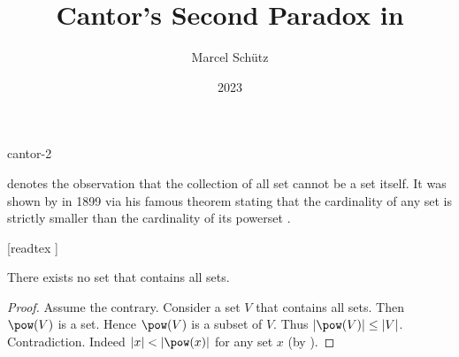 \documentclass{stex}
\begin{document}
\title{Cantor's Second Paradox in \Naproche}
\author{Marcel Schütz}
\date{2023}
\maketitle
\begin{smodule}{cantor-2}
\begin{sparagraph}
  \emph{} denotes the observation that the collection of all set cannot be a set itself.
  It was shown by  in 1899 via his famous theorem stating that the cardinality of any set is strictly smaller than the cardinality of its powerset \cite[chapter 163]{Cantor1991}.
\end{sparagraph}

\begin{forthel}
  [readtex ]

  \begin{theorem*}\label{cantor_paradox_2}
    There exists no set that contains all sets.
  \end{theorem*}
  \begin{proof}
    Assume the contrary.
    Consider a set $V$ that contains all sets.
    Then $\pow(V)$ is a set.
    Hence $\pow(V)$ is a subset of $V$.
    Thus $|\pow(V)| \leq |V|$.
    Contradiction.
    Indeed $|x| < |\pow(x)|$ for any set $x$ (by ).
  \end{proof}
\end{forthel}
\end{smodule}
\printbibliography
\end{document}
